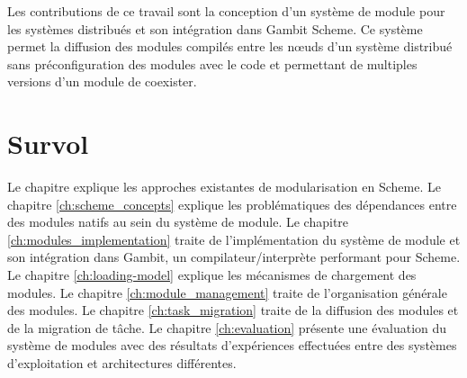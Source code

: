 Les contributions de ce travail sont la conception d'un système de module pour
les systèmes distribués et son intégration dans Gambit Scheme. Ce système
permet la diffusion des modules compilés entre les nœuds d'un système
distribué sans préconfiguration des modules avec le code et permettant
de multiples versions d'un module de coexister.


\section{Survol}

Le chapitre  explique les approches existantes de modularisation en Scheme.  Le
chapitre \ref{ch:scheme_concepts} explique les problématiques des dépendances
entre des modules natifs au sein du système de module. Le chapitre
\ref{ch:modules_implementation} traite de l'implémentation du système de module
et son intégration dans Gambit, un compilateur/interprète performant pour
Scheme. Le chapitre \ref{ch:loading-model} explique les mécanismes de
chargement des modules.  Le chapitre \ref{ch:module_management} traite de
l'organisation générale des modules. Le chapitre \ref{ch:task_migration} traite
de la diffusion des modules et de la migration de tâche.  Le chapitre
\ref{ch:evaluation} présente une évaluation du système de modules avec des
résultats d'expériences effectuées entre des systèmes d'exploitation et
architectures différentes.





